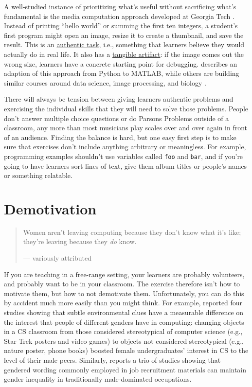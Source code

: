 A well-studied instance of prioritizing what's useful without
sacrificing what's fundamental is the media computation approach
developed at Georgia Tech \cite{Guzd2013}. Instead of printing ``hello
world'' or summing the first ten integers, a student's first program
might open an image, resize it to create a thumbnail, and save the
result. This is an \protect\hyperlink{g:authentic-task}{authentic task}, i.e.,
something that learners believe they would actually do in real life. It
also has a \protect\hyperlink{g:tangible-artifact}{tangible artifact}: if the
image comes out the wrong size, learners have a concrete starting point
for debugging. \cite{Lee2013} describes an adaption of this approach
from Python to MATLAB, while others are building similar courses around
data science, image processing, and biology
\cite{Dahl2018,Meys2018,Ritz2018}.

There will always be tension between giving learners authentic problems
and exercising the individual skills that they will need to solve those
problems. People don't answer multiple choice questions or do Parsons
Problems outside of a classroom, any more than most musicians play
scales over and over again in front of an audience. Finding the balance
is hard, but one easy first step is to make sure that exercises don't
include anything arbitrary or meaningless. For example, programming
examples shouldn't use variables called \texttt{foo} and \texttt{bar}, and if you're
going to have learners sort lines of text, give them album titles or
people's names or something relatable.

\section{Demotivation}\label{s:motivation-demotivation}

\begin{quote}\setlength{\parindent}{0pt}
Women aren't leaving computing because they don't know what it's like;
they're leaving because they \emph{do} know.

--- variously attributed
\end{quote}

If you are teaching in a free-range setting, your learners are probably
volunteers, and probably want to be in your classroom. The exercise
therefore isn't how to motivate them, but how to not demotivate them.
Unfortunately, you can do this by accident much more easily than you
might think. For example, \cite{Cher2009} reported four studies
showing that subtle environmental clues have a measurable difference on
the interest that people of different genders have in computing:
changing objects in a CS classroom from those considered stereotypical
of computer science (e.g., Star Trek posters and video games) to objects
not considered stereotypical (e.g., nature poster, phone books) boosted
female undergraduates' interest in CS to the level of their male peers.
Similarly, \cite{Gauc2011} reports a trio of studies showing that
gendered wording commonly employed in job recruitment materials can
maintain gender inequality in traditionally male-dominated occupations.

